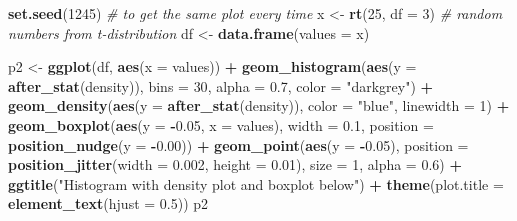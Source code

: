 \documentclass[
]{book}
\newenvironment{Shaded}{\begin{snugshade}}{\end{snugshade}}
\newcommand{\AttributeTok}[1]{\textcolor[rgb]{0.13,0.29,0.53}{#1}}
\newcommand{\CommentTok}[1]{\textcolor[rgb]{0.56,0.35,0.01}{\textit{#1}}}
\newcommand{\DecValTok}[1]{\textcolor[rgb]{0.00,0.00,0.81}{#1}}
\newcommand{\FloatTok}[1]{\textcolor[rgb]{0.00,0.00,0.81}{#1}}
\newcommand{\FunctionTok}[1]{\textcolor[rgb]{0.13,0.29,0.53}{\textbf{#1}}}
\newcommand{\NormalTok}[1]{#1}
\newcommand{\OtherTok}[1]{\textcolor[rgb]{0.56,0.35,0.01}{#1}}
\newcommand{\SpecialCharTok}[1]{\textcolor[rgb]{0.81,0.36,0.00}{\textbf{#1}}}
\newcommand{\StringTok}[1]{\textcolor[rgb]{0.31,0.60,0.02}{#1}}
\begin{document}
\begin{Shaded}
\begin{Highlighting}[]
\FunctionTok{set.seed}\NormalTok{(}\DecValTok{1245}\NormalTok{) }\CommentTok{\# to get the same plot every time}
\NormalTok{x }\OtherTok{\textless{}{-}} \FunctionTok{rt}\NormalTok{(}\DecValTok{25}\NormalTok{, }\AttributeTok{df =} \DecValTok{3}\NormalTok{) }\CommentTok{\# random numbers from t{-}distribution}
\NormalTok{df }\OtherTok{\textless{}{-}} \FunctionTok{data.frame}\NormalTok{(}\AttributeTok{values =}\NormalTok{ x)}

\NormalTok{p2 }\OtherTok{\textless{}{-}} \FunctionTok{ggplot}\NormalTok{(df, }\FunctionTok{aes}\NormalTok{(}\AttributeTok{x =}\NormalTok{ values)) }\SpecialCharTok{+}
  \FunctionTok{geom\_histogram}\NormalTok{(}\FunctionTok{aes}\NormalTok{(}\AttributeTok{y =} \FunctionTok{after\_stat}\NormalTok{(density)),}
                 \AttributeTok{bins =} \DecValTok{30}\NormalTok{, }\AttributeTok{alpha =} \FloatTok{0.7}\NormalTok{, }\AttributeTok{color =} \StringTok{"darkgrey"}\NormalTok{) }\SpecialCharTok{+}
  \FunctionTok{geom\_density}\NormalTok{(}\FunctionTok{aes}\NormalTok{(}\AttributeTok{y =} \FunctionTok{after\_stat}\NormalTok{(density)), }\AttributeTok{color =} \StringTok{"blue"}\NormalTok{, }\AttributeTok{linewidth =} \DecValTok{1}\NormalTok{) }\SpecialCharTok{+}
  \FunctionTok{geom\_boxplot}\NormalTok{(}\FunctionTok{aes}\NormalTok{(}\AttributeTok{y =} \SpecialCharTok{{-}}\FloatTok{0.05}\NormalTok{, }\AttributeTok{x =}\NormalTok{ values), }\AttributeTok{width =} \FloatTok{0.1}\NormalTok{,}
               \AttributeTok{position =} \FunctionTok{position\_nudge}\NormalTok{(}\AttributeTok{y =} \SpecialCharTok{{-}}\FloatTok{0.00}\NormalTok{)) }\SpecialCharTok{+}
  \FunctionTok{geom\_point}\NormalTok{(}\FunctionTok{aes}\NormalTok{(}\AttributeTok{y =} \SpecialCharTok{{-}}\FloatTok{0.05}\NormalTok{),}
             \AttributeTok{position =} \FunctionTok{position\_jitter}\NormalTok{(}\AttributeTok{width =} \FloatTok{0.002}\NormalTok{, }\AttributeTok{height =} \FloatTok{0.01}\NormalTok{),}
             \AttributeTok{size =} \DecValTok{1}\NormalTok{, }\AttributeTok{alpha =} \FloatTok{0.6}\NormalTok{) }\SpecialCharTok{+}
  \FunctionTok{ggtitle}\NormalTok{(}\StringTok{"Histogram with density plot and boxplot below"}\NormalTok{) }\SpecialCharTok{+}
  \FunctionTok{theme}\NormalTok{(}\AttributeTok{plot.title =} \FunctionTok{element\_text}\NormalTok{(}\AttributeTok{hjust =} \FloatTok{0.5}\NormalTok{))}
\NormalTok{p2}
\end{Highlighting}
\end{Shaded}
\end{document}
